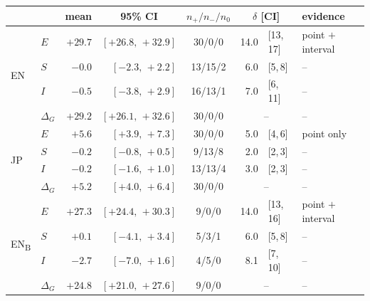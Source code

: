 \begin{tabular}{llrrcr@{\,}ll}
\toprule
& & \multicolumn{1}{c}{mean} & \multicolumn{1}{c}{95\% CI} & $n_+/n_-/n_0$ & \multicolumn{2}{c}{$\delta$ [CI]} & evidence \\
\midrule
\multirow{4}{*}{EN} & $E$ & $+29.7$ & $[+26.8,\,+32.9]$ & 30/0/0 & 14.0 & [13,\,17] & point $+$ interval \\
 & $S$ & $-0.0$ & $[-2.3,\,+2.2]$ & 13/15/2 & 6.0 & [5,\,8] & -- \\
 & $I$ & $-0.5$ & $[-3.8,\,+2.9]$ & 16/13/1 & 7.0 & [6,\,11] & -- \\
 & $\Delta_G$ & $+29.2$ & $[+26.1,\,+32.6]$ & 30/0/0 & \multicolumn{2}{c}{--} & -- \\
\midrule
\multirow{4}{*}{JP} & $E$ & $+5.6$ & $[+3.9,\,+7.3]$ & 30/0/0 & 5.0 & [4,\,6] & point only \\
 & $S$ & $-0.2$ & $[-0.8,\,+0.5]$ & 9/13/8 & 2.0 & [2,\,3] & -- \\
 & $I$ & $-0.2$ & $[-1.6,\,+1.0]$ & 13/13/4 & 3.0 & [2,\,3] & -- \\
 & $\Delta_G$ & $+5.2$ & $[+4.0,\,+6.4]$ & 30/0/0 & \multicolumn{2}{c}{--} & -- \\
\midrule
\multirow{4}{*}{EN\textsubscript{B}} & $E$ & $+27.3$ & $[+24.4,\,+30.3]$ & 9/0/0 & 14.0 & [13,\,16] & point $+$ interval \\
 & $S$ & $+0.1$ & $[-4.1,\,+3.4]$ & 5/3/1 & 6.0 & [5,\,8] & -- \\
 & $I$ & $-2.7$ & $[-7.0,\,+1.6]$ & 4/5/0 & 8.1 & [7,\,10] & -- \\
 & $\Delta_G$ & $+24.8$ & $[+21.0,\,+27.6]$ & 9/0/0 & \multicolumn{2}{c}{--} & -- \\
\bottomrule
\end{tabular}
